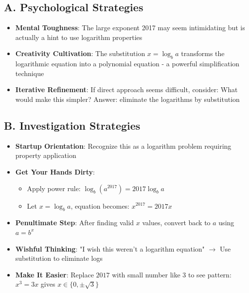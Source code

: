 \documentclass[]{article}
\begin{document}
\begin{strategicbox}
\subsection*{A. Psychological Strategies}
\begin{itemize}[leftmargin=*]
    \item \textbf{Mental Toughness}: The large exponent 2017 may seem intimidating but is actually a hint to use logarithm properties
    
    \item \textbf{Creativity Cultivation}: The substitution $x = \log_b a$ transforms the logarithmic equation into a polynomial equation - a powerful simplification technique
    
    \item \textbf{Iterative Refinement}: If direct approach seems difficult, consider: What would make this simpler? Answer: eliminate the logarithms by substitution
\end{itemize}

\subsection*{B. Investigation Strategies}
\begin{itemize}[leftmargin=*]
    \item \textbf{Startup Orientation}: Recognize this as a logarithm problem requiring property application
    
    \item \textbf{Get Your Hands Dirty}: 
    \begin{itemize}
        \item Apply power rule: $\log_b(a^{2017}) = 2017\log_b a$
        \item Let $x = \log_b a$, equation becomes: $x^{2017} = 2017x$
    \end{itemize}
    
    \item \textbf{Penultimate Step}: After finding valid $x$ values, convert back to $a$ using $a = b^x$
    
    \item \textbf{Wishful Thinking}: "I wish this weren't a logarithm equation" $\rightarrow$ Use substitution to eliminate logs
    
    \item \textbf{Make It Easier}: Replace $2017$ with small number like $3$ to see pattern: $x^3 = 3x$ gives $x \in \{0, \pm\sqrt{3}\}$
    

\end{itemize}
\end{strategicbox}
\end{document}
